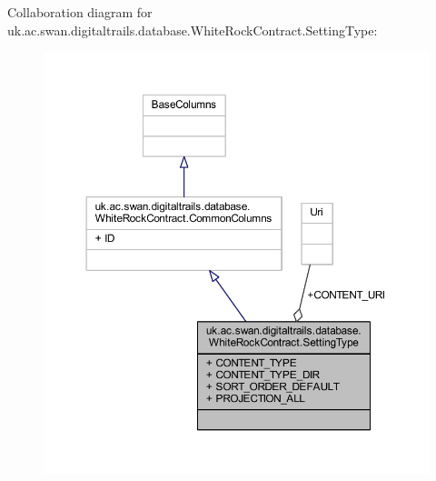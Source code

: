 Collaboration diagram for uk.\+ac.\+swan.\+digitaltrails.\+database.\+White\+Rock\+Contract.\+Setting\+Type\+:
\nopagebreak
\begin{figure}[H]
\begin{center}
\leavevmode
\includegraphics[width=350pt]{classuk_1_1ac_1_1swan_1_1digitaltrails_1_1database_1_1_white_rock_contract_1_1_setting_type__coll__graph}
\end{center}
\end{figure}
